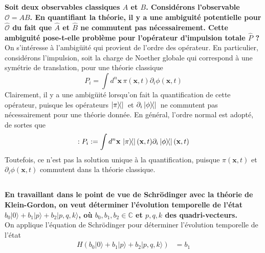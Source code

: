 \documentclass{article}
\numberwithin{equation}{section}
\begin{document}
\subsection{}
\textbf{Soit deux observables classiques $A$ et $B$. Considérons l’observable $\mathcal{O} = AB$. 
En quantifiant la théorie, il y a une ambiguité potentielle pour $\hat{\mathcal{O}}$ du fait que $\hat{A}$ et $\hat{B}$ ne commutent
pas nécessairement. Cette ambiguité pose-t-elle problème pour l’opérateur d’impulsion totale $\hat{P}$ ?} \\

On s'intéresse à l'ambigüité qui provient de l'ordre des opérateur. En particulier, considérons l'impulsion, 
soit la charge de Noether globale qui correspond à une symétrie de translation, pour une théorie classique
\begin{equation}
        P_i = \int d^{n}\mathbf{x}\, \pi(\mathbf{x}, t) \partial_i \phi(\mathbf{x}, t)
\end{equation} 
Clairement, il y a une ambigüité lorsqu'on fait la quantification de cette opérateur, puisque les opérateurs 
$\op{\pi}{}{}$ et $\partial_i\op{\phi}{}{}$ ne commutent pas nécessairement pour une théorie donnée. En général, 
l'ordre normal est adopté, de sortes que
\begin{equation}
        :P_i: = \int d^{n}\mathbf{x} \, \op{\pi}{}{}(\mathbf{x}, t) \partial_i \op{\phi}{}{}(\mathbf{x}, t)
\end{equation} 
Toutefois, ce n'est pas la solution unique à la quantification, puisque $\pi(\mathbf{x}, t)$ et $\partial_i \phi(\mathbf{x}, t)$ commutent dans 
la théorie classique.


\subsection{}
\textbf{En travaillant dans le point de vue de Schrödinger avec la théorie de Klein-Gordon,
on veut déterminer l’évolution temporelle de l’état $b_0 | 0 \rangle + b_1 | p \rangle + b_2 | p, q, k \rangle $, où $b_0,b_1,b_2 \in \mathbb{C}$ et $p, q, k$ des quadri-vecteurs.}\\ 
On applique l'équation de Schrödinger pour déterminer l'évolution temporelle de l'état
\begin{align*}
        H(b_0 | 0 \rangle + b_1 | p \rangle + b_2 | p, q, k \rangle  ) &= b_1 
\end{align*}
\end{document}
